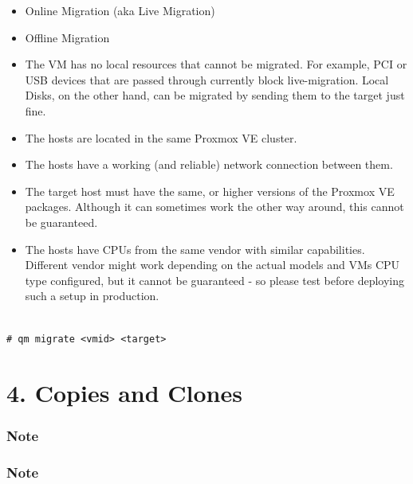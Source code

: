 \begin{itemize}[leftmargin=2cm]

	\item Online Migration (aka Live Migration)

	\item Offline Migration

\end{itemize}

\begin{itemize}[leftmargin=2cm]

	\item The VM has no local resources that cannot be migrated. For example, PCI or USB devices that are passed through currently block live-migration. Local Disks, on the other hand, can be migrated by sending them to the target just fine.

	\item The hosts are located in the same Proxmox VE cluster.

	\item The hosts have a working (and reliable) network connection between them.

	\item The target host must have the same, or higher versions of the Proxmox VE packages. Although it can sometimes work the other way around, this cannot be guaranteed.

	\item The hosts have CPUs from the same vendor with similar capabilities. Different vendor might work depending on the actual models and VMs CPU type configured, but it cannot be guaranteed - so please test before deploying such a setup in production.

\end{itemize}

\begin{lstlisting}

# qm migrate <vmid> <target>

\end{lstlisting}


\section{4. Copies and Clones}

\subsubsection{Note}

\subsubsection{Note}

